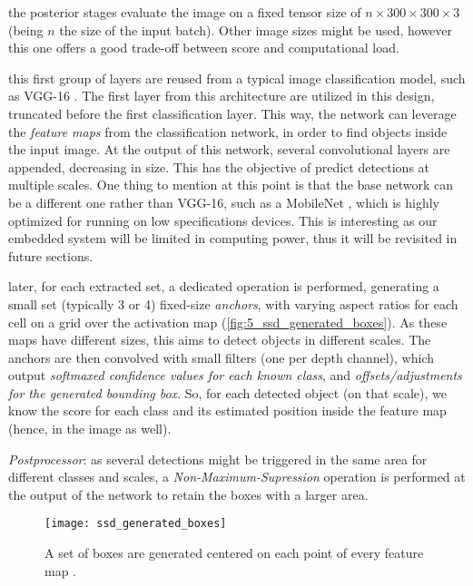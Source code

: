 
\begin{description}
	
	\item[Reshape] the posterior stages evaluate the image on a fixed tensor size of $n \times 300 \times 300 \times 3$ (being $n$ the size of the input batch). Other image sizes might be used, however this one offers a good trade-off between score and computational load.
	
	\item [Base network] this first group of layers are reused from a typical image classification model, such as VGG-16 \cite{vgg16}. The first layer from this architecture are utilized in this design, truncated before the first classification layer. This way, the network can leverage the \textit{feature maps} from the classification network, in order to find objects inside the input image. At the output of this network, several convolutional layers are appended, decreasing in size. This has the objective of predict detections at multiple scales. One thing to mention at this point is that the base network can be a different one rather than VGG-16, such as a MobileNet \cite{mobilenet}, which is highly optimized for running on low specifications devices. This is interesting as our embedded system will be limited in computing power, thus it will be revisited in future sections.
	
	\item[Box predictors] later, for each extracted set, a dedicated operation is performed, generating a small set (typically 3 or 4) fixed-size \textit{anchors}, with varying aspect ratios for each cell on a grid over the activation map (\autoref{fig:5_ssd_generated_boxes}). As these maps have different sizes, this aims to detect  objects in different scales. The anchors are then convolved with small filters (one per depth channel), which output \emph{softmaxed confidence values for each known class}, and \emph{offsets/adjustments for the generated bounding box}. So, for each detected object (on that scale), we know the score for each class and its estimated position inside the feature map (hence, in the image as well).
	
	\item \emph{Postprocessor}: as several detections might be triggered in the same area for different classes and scales, a \textit{Non-Maximum-Supression} operation is performed at the output of the network to retain the boxes with a larger area.
\end{description}
	\begin{figure}[h]
	\centering
	\texttt{[image: ssd\_generated\_boxes]}
	\caption{A set of boxes are generated centered on each point of every feature map \cite{ssd}.}
	\label{fig:5_ssd_generated_boxes}
\end{figure}


